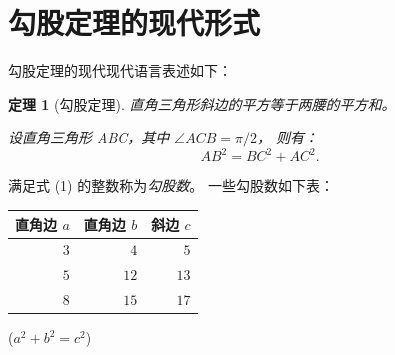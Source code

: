 \documentclass[UTF8]{ctexart}
\newtheorem{thm}{定理}
\begin{document}
    \section{勾股定理的现代形式}
        勾股定理的现代现代语言表述如下\cite{Shiye}：
        \begin{thm}[勾股定理]
            直角三角形斜边的平方等于两腰的平方和。

            设直角三角形 ABC，其中 $\angle ACB = \pi / 2$，
            则有：
            \begin{equation}
                AB^2 = BC^2 + AC^2.
            \end{equation}
        \end{thm}

        满足式 (1) 的整数称为\emph{勾股数}。
        一些勾股数如下表：
        \\[3pt]

        \begin{table}[ht]
            \begin{tabular}{|rrr|}
                \hline
                直角边 $a$ & 直角边 $b$ & 斜边 $c$\\
                \hline
                $3$ & $4$ & $5$ \\
                \hline
                $5$ & $12$ & $13$ \\
                \hline
                $8$ & $15$ & $17$ \\
                \hline
            \end{tabular}
            \qquad
            ($a^2 + b^2 = c^2$)
        \end{table}

    
    
    
\end{document}
